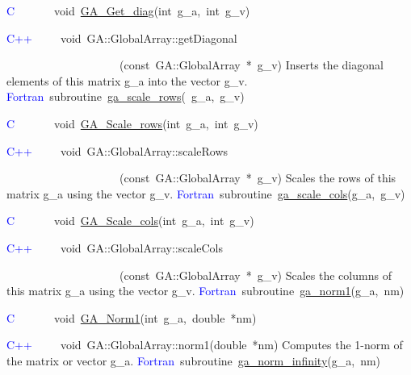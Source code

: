 \textcolor{blue}{C}~~~~~~~void~\href{http://www.emsl.pnl.gov/docs/global/c_nga_ops.html\#ga_get_diag}{GA\_{}Get\_{}diag}(int~g\_a,~int~g\_v)

\textcolor{blue}{C++~}~~~~void~GA::GlobalArray::getDiagonal

~~~~~~~~~~~~~~~~~~~~(const~GA::GlobalArray~{*}~g\_v)
Inserts the diagonal elements of this matrix g\_a into the vector
g\_v. 
\textcolor{blue}{Fortran}~subroutine~\href{http://www.emsl.pnl.gov/docs/global/ga_ops.html\#ga_scale_rows}{ga\_{}scale\_{}rows}(~g\_a,~g\_v)

\textcolor{blue}{C}~~~~~~~void~\href{http://www.emsl.pnl.gov/docs/global/c_nga_ops.html\#ga_scale_rows}{GA\_{}Scale\_{}rows}(int~g\_a,~int~g\_v)~

\textcolor{blue}{C++}~~~~~void~GA::GlobalArray::scaleRows

~~~~~~~~~~~~~~~~~~~~(const~GA::GlobalArray~{*}~g\_v)
Scales the rows of this matrix g\_a using the vector g\_v. 
\textcolor{blue}{Fortran}~subroutine~\href{http://www.emsl.pnl.gov/docs/global/ga_ops.html\#ga_scale_cols}{ga\_{}scale\_{}cols}(g\_a,~g\_v)~

\textcolor{blue}{C}~~~~~~~void~\href{http://www.emsl.pnl.gov/docs/global/c_nga_ops.html\#ga_scale_cols}{GA\_{}Scale\_{}cols}(int~g\_a,~int~g\_v)~

\textcolor{blue}{C++}~~~~~void~GA::GlobalArray::scaleCols

~~~~~~~~~~~~~~~~~~~~(const~GA::GlobalArray~{*}~g\_v)
Scales the columns of this matrix g\_a using the vector g\_v. 
\textcolor{blue}{Fortran}~subroutine~\href{http://www.emsl.pnl.gov/docs/global/ga_ops.html\#ga_norm1}{ga\_{}norm1}(g\_a,~nm)

\textcolor{blue}{C}~~~~~~~void~\href{http://www.emsl.pnl.gov/docs/global/c_nga_ops.html\#ga_norm1}{GA\_{}Norm1}(int~g\_a,~double~{*}nm)

\textcolor{blue}{C++}~~~~~void~GA::GlobalArray::norm1(double~{*}nm)
Computes the 1-norm of the matrix or vector g\_a. 
\textcolor{blue}{Fortran}~subroutine~\href{http://www.emsl.pnl.gov/docs/global/ga_ops.html\#ga_norm_infinity}{ga\_{}norm\_{}infinity}(g\_a,~nm)~

